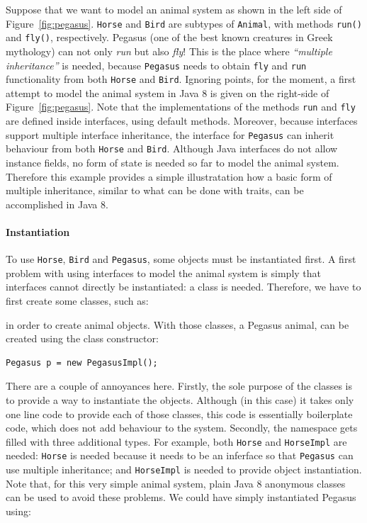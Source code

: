 Suppose that we want to model an animal system as shown in
the left side of Figure~\ref{fig:pegasus}. \texttt{Horse} and \texttt{Bird} are subtypes
of \texttt{Animal}, with methods \texttt{run()} and \texttt{fly()},
respectively. Pegasus (one of the best known creatures in Greek
mythology) can not only \emph{run} but also \emph{fly}! This is the
place where \emph{``multiple inheritance''} is needed, because
\texttt{Pegasus} needs to obtain \texttt{fly} and \texttt{run}
functionality from both \texttt{Horse} and \texttt{Bird}.
Ignoring points, for the moment, a 
first attempt to model the animal system in Java 8 is given on the right-side 
of Figure~\ref{fig:pegasus}.
Note that the implementations of the methods \texttt{run}
and \texttt{fly} are defined inside interfaces, using default
methods. Moreover, because interfaces support multiple interface
inheritance, the interface for \texttt{Pegasus} can inherit behaviour
from both \texttt{Horse} and \texttt{Bird}. Although Java interfaces
do not allow instance fields, no form of state is needed so far to
model the animal system.  Therefore this example provides a simple
illustratation how a basic form of multiple inheritance, similar to
what can be done with traits, can be accomplished in Java 8.

\paragraph{Instantiation}
To use \texttt{Horse}, \texttt{Bird} and \texttt{Pegasus}, some
objects must be instantiated first. A first problem with using
interfaces to model the animal system is simply that interfaces 
cannot directly be instantiated: a class is needed. Therefore, we have
to first create some classes, such as: 


\noindent in order to create animal objects. With those classes, 
a Pegasus animal, can be created using the class constructor:

\begin{lstlisting}
Pegasus p = new PegasusImpl();
\end{lstlisting}

\noindent There are a couple of annoyances here. Firstly, the sole
purpose of the classes is to provide a way to instantiate the
objects. Although (in this case) it takes only one line code to
provide each of those classes, this code is essentially boilerplate
code, which does not add behaviour to the system. Secondly, 
the namespace gets filled with three additional types. For example, 
both \texttt{Horse} and \texttt{HorseImpl} are needed: \texttt{Horse}
is needed because it needs to be an inferface so that \texttt{Pegasus}
can use multiple inheritance; and \texttt{HorseImpl} is needed to
provide object instantiation. 
Note that, for this very simple animal system, plain Java 8 anonymous
classes can be used to avoid these problems.  We could have simply
instantiated Pegasus using:

